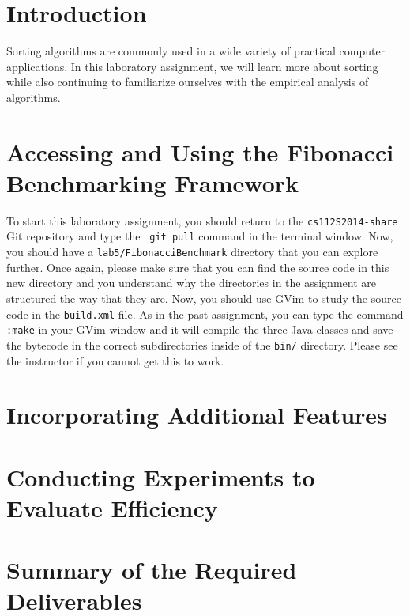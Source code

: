 


\usepackage[compact]{titlesec}


\section*{Introduction}

Sorting algorithms are commonly used in a wide variety of practical computer applications.  In this laboratory
assignment, we will learn more about sorting while also continuing to familiarize ourselves with the empirical analysis
of algorithms.

\section*{Accessing and Using the Fibonacci Benchmarking Framework}

To start this laboratory assignment, you should return to the {\tt cs112S2014-share} Git repository and type the {\tt
git pull} command in the terminal window.  Now, you should have a {\tt lab5/FibonacciBenchmark} directory that you can
explore further.  Once again, please make sure that you can find the source code in this new directory and you
understand why the directories in the assignment are structured the way that they are. Now, you should use GVim to study
the source code in the {\tt build.xml} file.  As in the past assignment, you can type the command {\tt :make} in your
GVim window and it will compile the three Java classes and save the bytecode in the correct subdirectories inside of the
{\tt bin/} directory.  Please see the instructor if you cannot get this to work.


\section*{Incorporating Additional Features}

\section*{Conducting Experiments to Evaluate Efficiency}

\section*{Summary of the Required Deliverables}

